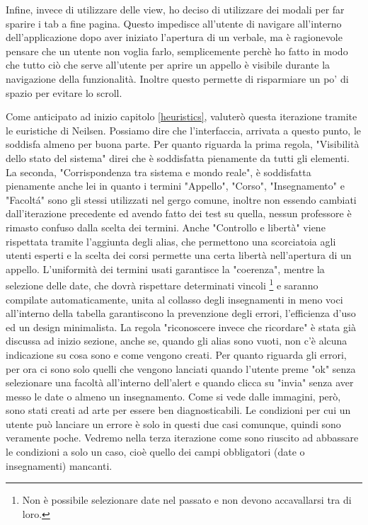 \documentclass[Lau, oneside]{sapthesis}%
\begin{document}
Infine, invece di utilizzare delle view, ho deciso di utilizzare dei modali per far sparire i tab a fine pagina. Questo impedisce all'utente di navigare all'interno dell'applicazione dopo aver iniziato l'apertura di un verbale, ma è ragionevole pensare che un utente non voglia farlo, semplicemente perchè ho fatto in modo che tutto ciò che serve all'utente per aprire un appello è visibile durante la navigazione della funzionalità. Inoltre questo permette di risparmiare un po' di spazio per evitare lo scroll.

Come anticipato ad inizio capitolo \ref{heuristics}, valuterò questa iterazione tramite le euristiche di Neilsen. Possiamo dire che l'interfaccia, arrivata a questo punto, le soddisfa almeno per buona parte.
Per quanto riguarda la prima regola, "Visibilità dello stato del sistema" direi che è soddisfatta pienamente da tutti gli elementi. La seconda, "Corrispondenza tra sistema e mondo reale", è soddisfatta pienamente anche lei in quanto i termini "Appello", "Corso", "Insegnamento" e "Facolt\'a" sono gli stessi utilizzati nel gergo comune, inoltre non essendo cambiati dall'iterazione precedente ed avendo fatto dei test su quella, nessun professore è rimasto confuso dalla scelta dei termini. Anche "Controllo e libertà" viene rispettata tramite l'aggiunta degli alias, che permettono una scorciatoia agli utenti esperti e la scelta dei corsi permette una certa libertà nell'apertura di un appello. L'uniformità dei termini usati garantisce la "coerenza", mentre la selezione delle date, che dovrà rispettare determinati vincoli \footnote{Non è possibile selezionare date nel passato e non devono accavallarsi tra di loro.} e saranno compilate automaticamente, unita al collasso degli insegnamenti in meno voci all'interno della tabella garantiscono la prevenzione degli errori, l'efficienza d'uso ed un design minimalista. La regola "riconoscere invece che ricordare" è stata già discussa ad inizio sezione, anche se, quando gli alias sono vuoti, non c'è alcuna indicazione su cosa sono e come vengono creati. Per quanto riguarda gli errori, per ora ci sono solo quelli che vengono lanciati quando l'utente preme "ok" senza selezionare una facoltà all'interno dell'alert e quando clicca su "invia" senza aver messo le date o almeno un insegnamento. Come si vede dalle immagini, però, sono stati creati ad arte per essere ben diagnosticabili. Le condizioni per cui un utente può lanciare un errore è solo in questi due casi comunque, quindi sono veramente poche. Vedremo nella terza iterazione come sono riuscito ad abbassare le condizioni a solo un caso, cioè quello dei campi obbligatori (date o insegnamenti) mancanti.
\end{document}
